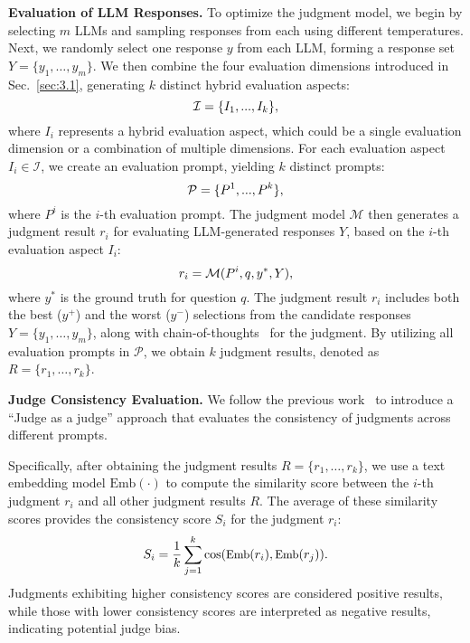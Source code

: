 \textbf{Evaluation of LLM Responses.} To optimize the judgment model, we begin by selecting $m$ LLMs and sampling responses from each using different temperatures. Next, we randomly select one response $y$ from each LLM, forming a response set $Y=\{y_1, \dots, y_m\}$. We then combine the four evaluation dimensions introduced in Sec.~\ref{sec:3.1}, generating $k$ distinct hybrid evaluation aspects:
\begin{equation}\small
\mathcal{I} = \{I_1,...,I_k\},
\end{equation}
where $I_i$ represents a hybrid evaluation aspect, which could be a single evaluation dimension or a combination of multiple dimensions. For each evaluation aspect $I_i \in \mathcal{I}$, we create an evaluation prompt, yielding $k$ distinct prompts:
\begin{equation}\small
\mathcal{P} = \{P^1,...,P^k\},
\end{equation}
where $P^i$ is the $i$-th evaluation prompt. The judgment model $\mathcal{M}$ then generates a judgment result $r_i$ for evaluating LLM-generated responses $Y$, based on the $i$-th evaluation aspect $I_i$:
\begin{equation}\small
r_i = \mathcal{M}(P^i,q,y^*, Y),
\end{equation}
where $y^*$ is the ground truth for question $q$. The judgment result $r_i$ includes both the best ($y^+$) and the worst ($y^-$) selections from the candidate responses $Y = \{y_1, \dots, y_m\}$, along with chain-of-thoughts~\cite{Chain-of-Thought2022Wei} for the judgment. By utilizing all evaluation prompts in $\mathcal{P}$, we obtain $k$ judgment results, denoted as $R = \{r_1, \dots, r_k\}$.


\textbf{Judge Consistency Evaluation.} We follow the previous work~\cite{self-improve2023Li} to introduce a ``Judge as a judge'' approach that evaluates the consistency of judgments across different prompts.

Specifically, after obtaining the judgment results $R = \{r_1, \dots, r_k\}$, we use a text embedding model $\text{Emb}(\cdot)$ to compute the similarity score between the $i$-th judgment $r_i$ and all other judgment results $R$. The average of these similarity scores provides the consistency score $S_i$ for the judgment $r_i$:
\begin{equation}\small\label{eq:score}
S_i = \frac{1}{k} \sum_{j=1}^{k} \cos (\text{Emb}(r_i),\text{Emb}(r_j)).
\end{equation}
Judgments exhibiting higher consistency scores are considered positive results, while those with lower consistency scores are interpreted as negative results, indicating potential judge bias.



